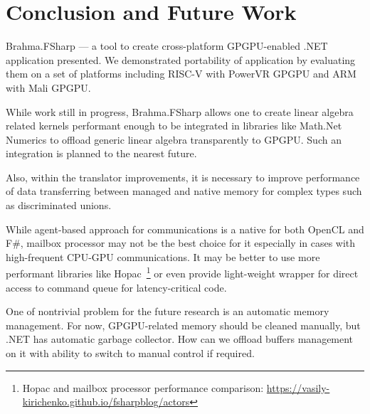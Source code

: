 \section{Conclusion and Future Work}

Brahma.FSharp --- a tool to create cross-platform GPGPU-enabled .NET application presented. 
We demonstrated portability of application by evaluating them on a set of platforms including RISC-V with PowerVR GPGPU and ARM with Mali GPGPU.

While work still in progress, Brahma.FSharp allows one to create linear algebra related kernels performant enough to be integrated in libraries like Math.Net Numerics to offload generic linear algebra transparently to GPGPU.
Such an integration is planned to the nearest future.

Also, within the translator improvements, it is necessary to improve performance of data transferring between managed and native memory for complex types such as discriminated unions.

While agent-based approach for communications is a native for both OpenCL and F\#, mailbox processor may not be the best choice for it especially in cases with high-frequent CPU-GPU communications.
It may be better to use more performant libraries like Hopac~\footnote{Hopac and mailbox processor performance comparison: \url{https://vasily-kirichenko.github.io/fsharpblog/actors}} or even provide light-weight wrapper for direct access to command queue for latency-critical code.

One of nontrivial problem for the future research is an automatic memory management.
For now, GPGPU-related memory should be cleaned manually, but .NET has automatic garbage collector. 
How can we offload buffers management on it with ability to switch to manual control if required. 



